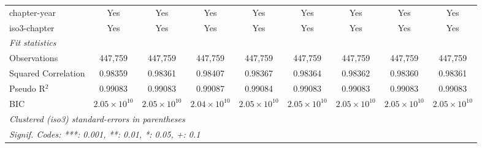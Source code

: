 \begin{tabular}{lcccccccc}
   chapter-year                                                       & Yes                   & Yes                   & Yes                   & Yes                   & Yes                   & Yes                   & Yes                   & Yes\\  
   iso3-chapter                                                       & Yes                   & Yes                   & Yes                   & Yes                   & Yes                   & Yes                   & Yes                   & Yes\\  
   \midrule
   \emph{Fit statistics}\\
   Observations                                                       & 447,759               & 447,759               & 447,759               & 447,759               & 447,759               & 447,759               & 447,759               & 447,759\\  
   Squared Correlation                                                & 0.98359               & 0.98361               & 0.98407               & 0.98367               & 0.98364               & 0.98362               & 0.98360               & 0.98361\\  
   Pseudo R$^2$                                                       & 0.99083               & 0.99083               & 0.99087               & 0.99084               & 0.99083               & 0.99083               & 0.99083               & 0.99083\\  
   BIC                                                                & $2.05\times 10^{10}$  & $2.05\times 10^{10}$  & $2.04\times 10^{10}$  & $2.05\times 10^{10}$  & $2.05\times 10^{10}$  & $2.05\times 10^{10}$  & $2.05\times 10^{10}$  & $2.05\times 10^{10}$\\   
   \midrule \midrule
   \multicolumn{9}{l}{\emph{Clustered (iso3) standard-errors in parentheses}}\\
   \multicolumn{9}{l}{\emph{Signif. Codes: ***: 0.001, **: 0.01, *: 0.05, +: 0.1}}\\
\end{tabular}
\par\endgroup


